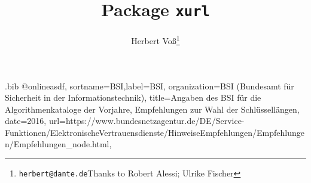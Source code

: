 %
\listfiles\setcounter{errorcontextlines}{100}
\RequirePackage{filecontents}
\begin{filecontents*}{\jobname.bib}
@online{asdf,
sortname={BSI},label={BSI},
organization={BSI (Bundesamt für Sicherheit in der Informationstechnik)},
title={Angaben des BSI für die Algorithmenkataloge der Vorjahre, Empfehlungen zur Wahl der Schlüssellängen},
date={2016},
url={https://www.bundesnetzagentur.de/DE/Service-Funktionen/ElektronischeVertrauensdienste/HinweiseEmpfehlungen/Empfehlungen/Empfehlungen_node.html},
}
\end{filecontents*}
\documentclass[paper=a4,fontsize=11pt,DIV=14,parskip=half-,
 captions=tableabove,twoside=on]{scrartcl}
\usepackage{fontspec}
\setmainfont{AccanthisADFStdNo3}[
UprightFont =*-Regular,
BoldFont=*-Bold,
ItalicFont=*-Italic,
BoldItalicFont=*-BoldItalic,
RawFeature= -rlig,
]
\setsansfont{GilliusADF}[
UprightFont =*-Regular,
BoldFont=*-Bold,
ItalicFont=*-Italic,
BoldItalicFont=*-BoldItalic,
RawFeature= -rlig,
]
\setmonofont{Anonymous Pro}[Scale=MatchLowercase,FakeStretch=0.9]

\usepackage[english]{babel}
\usepackage{scrlayer-scrpage}
\automark*[subsection]{}
\pagestyle{scrheadings}

\usepackage{biblatex}



\usepackage{xurl}
\title{Package \texttt{xurl}}
\author{Herbert Voß\thanks{\texttt{herbert@dante.de}\newline Thanks to Robert Alessi; Ulrike Fischer}}

\maketitle

\section{How it works}
Package xurl loads package url by default and defines
possible url breaks for all alphanumerical characters
and \verb|= / . : * - ~ ' "| 

All arguments which are valid for url can be used.
It will be passed to package url. xurl itself has no 
special optional argument. For more information read
the documentation of package url.

